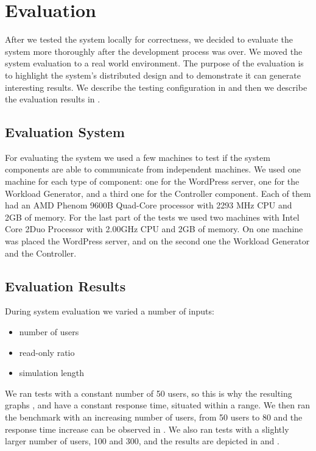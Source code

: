 \chapter{Evaluation}
\label{chapter:chapter5}

After we tested the system locally for correctness, we decided to evaluate the system more thoroughly after the development process was over. We moved the system evaluation to a real world environment. The purpose of the evaluation is to highlight the system's distributed design and to demonstrate it can generate interesting results. We describe the testing configuration in  and then we describe the evaluation results in .

\section{Evaluation System}
\label{sec:evaluation-system}

For evaluating the system we used a few machines to test if the system components are able to communicate from independent machines. We used one machine for each type of component: one for the WordPress server, one for the Workload Generator, and a third one for the Controller component. Each of them had an AMD Phenom 9600B Quad-Core processor with 2293 MHz CPU and 2GB of memory. For the last part of the tests we used two machines with Intel Core 2Duo Processor with 2.00GHz CPU and 2GB of memory. On one machine was placed the WordPress server, and on the second one the Workload Generator and the Controller.

\section{Evaluation Results}
\label{sec:evaluation-results}

During system evaluation we varied a number of inputs:
\begin{itemize}
 \item number of users
 \item read-only ratio
 \item simulation length
\end{itemize}

We ran tests with a constant number of 50 users, so this is why the resulting graphs ,  and  have a constant response time, situated within a range. We then ran the benchmark with an increasing number of users, from 50 users to 80 and the response time increase can be observed in . We also ran tests with a slightly larger number of users, 100 and 300, and the results are depicted in  and .

